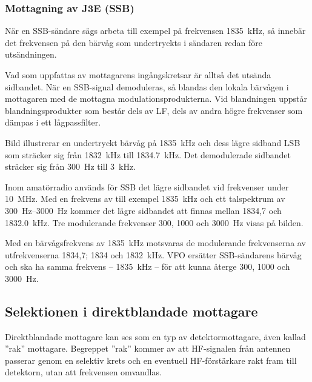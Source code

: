\subsubsection{Mottagning av J3E (SSB)}

När en SSB-sändare sägs arbeta till exempel på frekvensen
\qty{1835}{\kilo\hertz}, så innebär det frekvensen på den bärvåg som undertryckts
i sändaren redan före utsändningen.

Vad som uppfattas av mottagarens ingångskretsar är alltså det utsända sidbandet.
När en SSB-signal demoduleras, så blandas den lokala bärvågen i mottagaren med
de mottagna modulationsprodukterna.
Vid blandningen uppstår blandningsprodukter som består dels av LF, dels av
andra högre frekvenser som dämpas i ett lågpassfilter.

Bild  illustrerar en undertryckt bärvåg på
\qty{1835}{\kilo\hertz} och dess lägre sidband LSB som sträcker sig från
\qty{1832}{\kilo\hertz} till \qty{1834,7}{\kilo\hertz}.
Det demodulerade sidbandet sträcker sig från \qty{300}{\hertz} till
\qty{3}{\kilo\hertz}.

Inom amatörradio används för SSB det lägre sidbandet vid frekvenser
under \qty{10}{\mega\hertz}.
Med en frekvens av till exempel \qty{1835}{\kilo\hertz} och ett talspektrum av
\SIrange{300}{3000}{\hertz} kommer det lägre sidbandet att finnas mellan 1834,7
och \qty{1832,0}{\kilo\hertz}.
Tre modulerande frekvenser 300, 1000 och \qty{3000}{\hertz} visas på bilden.

Med en bärvågsfrekvens av \qty{1835}{\kilo\hertz} motsvaras de modulerande
frekvenserna av utfrekvenserna 1834,7; 1834 och \qty{1832}{\kilo\hertz}.
VFO ersätter SSB-sändarens bärvåg och ska ha samma frekvens --
\qty{1835}{\kilo\hertz} -- för att kunna återge 300, 1000 och \qty{3000}{\hertz}.

\newpage
\subsection{Selektionen i direktblandade mottagare}
\label{selektion_direktblandade}

Direktblandade mottagare kan ses som en typ av detektormottagare, även
kallad ''rak'' mottagare.
Begreppet ''rak'' kommer av att HF-signalen från antennen passerar genom en
selektiv krets och en eventuell HF-förstärkare rakt fram till detektorn,
utan att frekvensen omvandlas.

